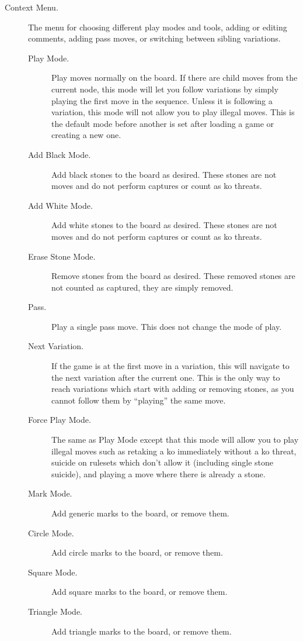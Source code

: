 \begin {description}
\item [Context Menu. ]
    The menu for choosing different play modes and tools, adding or editing
    comments, adding pass moves, or switching between sibling variations.
    \begin{description}
        \item[Play Mode.] Play moves normally on the board. If there are child
            moves from the current node, this mode will let you follow
            variations by simply playing the first move in the sequence.
            Unless it is following a variation, this mode will not allow you to
            play illegal moves. This is the default mode before another is set
            after loading a game or creating a new one.
        \item[Add Black Mode.] Add black stones to the board as desired. These
            stones are not moves and do not perform captures or count as ko threats.
        \item[Add White Mode.] Add white stones to the board as desired. These
            stones are not moves and do not perform captures or count as ko threats.
        \item[Erase Stone Mode.] Remove stones from the board as desired. These
            removed stones are not counted as captured, they are simply removed.
        \item[Pass.] Play a single pass move.  This does not change the mode of
            play.
        \item[Next Variation.] If the game is at the first move in a variation,
            this will navigate to the next variation after the current one. This
            is the only way to reach variations which start with adding or
            removing stones, as you cannot follow them by ``playing'' the same move.
        \item[Force Play Mode.] The same as Play Mode except that this mode will
            allow you to play illegal moves such as retaking a ko immediately
            without a ko threat, suicide on rulesets which don't allow it
            (including single stone suicide), and playing a move where there
            is already a stone.
        \item[Mark Mode.] Add generic marks to the board, or remove them.
        \item[Circle Mode.] Add circle marks to the board, or remove them.
        \item[Square Mode.] Add square marks to the board, or remove them.
        \item[Triangle Mode.] Add triangle marks to the board, or remove them.

\end{description}
\end{description}
